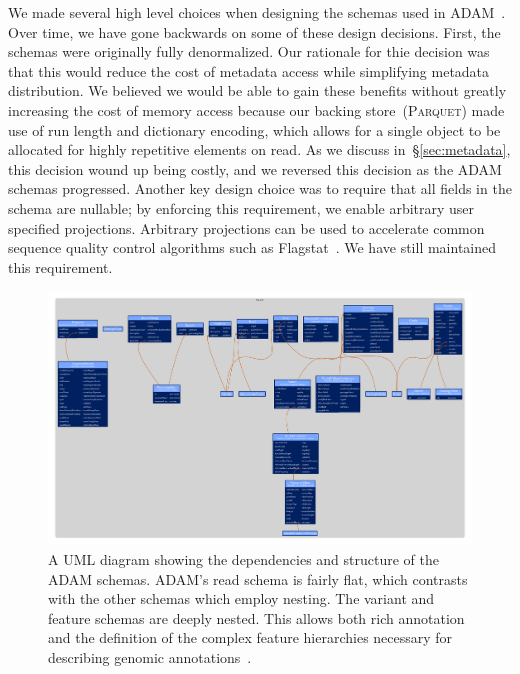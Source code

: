 \documentclass[phd]{ucbthesis}
\begin{document}
We made several high level choices when designing the schemas used in
\textsc{ADAM}~\cite{massie13}. Over time, we have gone backwards on some of
these design decisions. First, the schemas were originally fully denormalized.
Our rationale for thie decision was that this would reduce the cost of metadata
access while simplifying metadata distribution. We believed we would be able to
gain these benefits without greatly increasing the cost of memory access because
our backing store~(\textsc{Parquet}) made use of run length and dictionary
encoding, which allows for a single object to be allocated for highly repetitive
elements on read. As we discuss in~\S\ref{sec:metadata}, this decision wound up
being costly, and we reversed this decision as the \textsc{ADAM} schemas
progressed. Another key design choice was to require that all fields in the
schema are nullable; by enforcing this requirement, we enable arbitrary user
specified projections. Arbitrary projections can be used to accelerate
common sequence quality control algorithms such as Flagstat~\cite{massie13,
  nothaft15}. We have still maintained this requirement.

\begin{figure}[h]
\begin{center}
\includegraphics[width=0.95\linewidth]{graphs/bdg.pdf}
\end{center}
\caption{A UML diagram showing the dependencies and structure of the ADAM
  schemas. ADAM's read schema is fairly flat, which contrasts with the other
  schemas which employ nesting. The variant and feature schemas are deeply
  nested. This allows both rich annotation and the definition of the complex
  feature hierarchies necessary for describing genomic
  annotations~\cite{eilbeck05}.}
\label{fig:schemas}
\end{figure}
\end{document}

